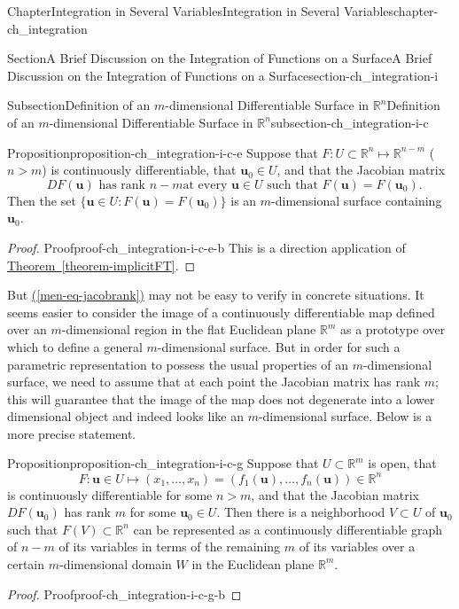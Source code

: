 \documentclass[oneside,10pt,]{book}
\newcommand{\xreffont}{\relax}
\numberwithin{equation}{section}
\newcommand{\bu}{\mathbf{u}}
\newcommand{\bbR}{\mathbb{R}}
\begin{document}
\begin{chapterptx}{Chapter}{Integration in Several Variables}{}{Integration in Several Variables}{}{}{chapter-ch_integration}
\begin{sectionptx}{Section}{A Brief Discussion on the Integration of Functions on a Surface}{}{A Brief Discussion on the Integration of Functions on a Surface}{}{}{section-ch_integration-i}
\begin{subsectionptx}{Subsection}{Definition of an \(m\)-dimensional Differentiable Surface in \(\bbR^{n}\)}{}{Definition of an \(m\)-dimensional Differentiable Surface in \(\bbR^{n}\)}{}{}{subsection-ch_integration-i-c}
\begin{proposition}{Proposition}{}{}{proposition-ch_integration-i-c-e}
Suppose that \(F: U\subset \bbR^{n}\mapsto \bbR^{n-m}\) (\(n > m\)) is continuously differentiable, that \(\bu_{0}\in U\), and that the Jacobian matrix%
\begin{equation}
\text{ $DF(\bu)$ has rank $n-m$
at every $\bu \in U$ such that $F(\bu)=F(\mathbf u_{0})$.}\label{men-eq-jacobrank}
\end{equation}
Then the set \(\{\bu\in U: F(\bu)=F(\mathbf u_{0})\}\) is an \(m\)-dimensional surface containing \(\bu_{0}\).%
\end{proposition}
\begin{proof}{Proof}{}{proof-ch_integration-i-c-e-b}
This is a direction application of \hyperref[theorem-implicitFT]{Theorem~{\xreffont\ref{theorem-implicitFT}}}.\end{proof}
But \hyperref[men-eq-jacobrank]{({\xreffont\ref{men-eq-jacobrank}})} may not be easy to verify in concrete situations. It seems easier to consider the image of a continuously differentiable map defined over an \(m\)-dimensional region in the flat Euclidean plane \(\bbR^{m}\) as a prototype over which to define a general \(m\)-dimensional surface. But in order for such a parametric representation to possess the usual properties of an \(m\)-dimensional surface, we  need to assume that at each point the Jacobian matrix has rank \(m\); this will guarantee that the image of the map does not degenerate into a lower dimensional object and indeed looks like an \(m\)-dimensional surface. Below is a more precise statement.%
\begin{proposition}{Proposition}{}{}{proposition-ch_integration-i-c-g}%
Suppose that \(U\subset \mathbb R^{m}\) is open, that%
\begin{equation*}
F: \bu\in U\mapsto 
(x_{1}, \ldots, x_{n})=(f_{1}(\bu), \ldots, f_{n}(\bu)) \in \mathbb R^{n}
\end{equation*}
is continuously differentiable for some \(n>m\), and that the Jacobian matrix  \(DF(\bu_{0})\) has rank \(m\) for some \(\bu_{0}\in U\). Then there is a neighborhood \(V\subset U\) of \(\bu_{0}\) such that \(F(V)\subset \mathbb R^{n}\) can be represented as a continuously differentiable graph of \(n-m\) of its variables in terms of the remaining \(m\) of its variables over a certain \(m\)-dimensional domain \(W\) in the Euclidean plane \(\bbR^{m}\).%
\end{proposition}
\begin{proof}{Proof}{}{proof-ch_integration-i-c-g-b}

\end{proof}
\end{subsectionptx}
\end{sectionptx}
\end{chapterptx}
\end{document}
